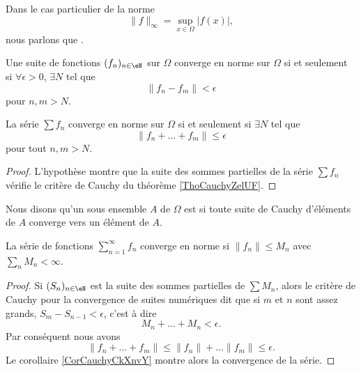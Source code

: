 Dans le cas particulier de la norme 
\begin{equation}
    \| f \|_{\infty}=\sup_{x\in\Omega}| f(x) |,
\end{equation}
nous parlons que .

\begin{theorem}  \label{ThoCauchyZelUF}
    Une suite de fonctions  \( (f_n)_{n\in\eN}\) sur \( \Omega\) converge en norme sur \( \Omega\) si et seulement si \( \forall\epsilon>0\), \( \exists N\) tel que
    \begin{equation}
        \| f_n-f_m \|<\epsilon
    \end{equation}
    pour \( n,m>N\).
\end{theorem}

\begin{corollary}       \label{CorCauchyCkXnvY}
    La série \( \sum f_n\) converge en norme sur \( \Omega\) si et seulement si \( \exists N\) tel que
    \begin{equation}
        \| f_n+\ldots+f_m \|\leq \epsilon
    \end{equation}
    pour tout \( n,m>N\).
\end{corollary}

\begin{proof}
    L'hypothèse montre que la suite des sommes partielles de la série \( \sum f_n\) vérifie le critère de Cauchy du théorème \ref{ThoCauchyZelUF}.
\end{proof}

\begin{definition}
    Nous disons qu'un sous ensemble \( A\) de \( \Omega\) est  si toute suite de Cauchy d'éléments de \( A\) converge vers un élément de \( A\).
\end{definition}

\begin{theorem}[Weierstrass]
    La série de fonctions \( \sum_{n=1}^{\infty}f_n\) converge en norme si \( \| f_n \|\leq M_n\) avec \( \sum_nM_n<\infty\).
\end{theorem}

\begin{proof}
    Si \( (S_n)_{n\in\eN}\) est la suite des sommes partielles de \( \sum M_n\), alors le critère de Cauchy pour la convergence de suites numériques dit que si \( m\) et \( n\) sont assez grands, \( S_m-S_{n-1}<\epsilon\), c'est à dire
    \begin{equation}
        M_n+\ldots+M_n<\epsilon.
    \end{equation}
    Par conséquent nous avons
    \begin{equation}
        \| f_n+\ldots+f_m \|\leq\| f_n \|+\ldots\| f_m \|\leq \epsilon.
    \end{equation}
    Le corollaire \ref{CorCauchyCkXnvY} montre alors la convergence de la série.
\end{proof}

